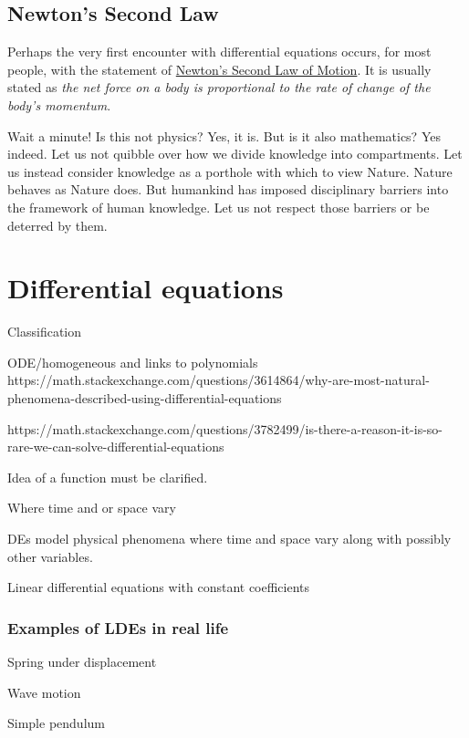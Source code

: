 \documentclass[
  a4paper,
]{article}
\begin{document}
\subsection{Newton's Second Law}\label{newtons-second-law}

Perhaps the very first encounter with differential equations occurs, for
most people, with the statement of
\href{https://www.britannica.com/science/Newtons-laws-of-motion/Newtons-second-law-F-ma}{Newton's
Second Law of Motion}. It is usually stated as \emph{the net force on a
body is proportional to the rate of change of the body's momentum}.

Wait a minute! Is this not physics? Yes, it is. But is it also
mathematics? Yes indeed. Let us not quibble over how we divide knowledge
into compartments. Let us instead consider knowledge as a porthole with
which to view Nature. Nature behaves as Nature does. But humankind has
imposed disciplinary barriers into the framework of human knowledge. Let
us not respect those barriers or be deterred by them.

\section{Differential equations}\label{differential-equations}

Classification

ODE/homogeneous and links to polynomials
https://math.stackexchange.com/questions/3614864/why-are-most-natural-phenomena-described-using-differential-equations

https://math.stackexchange.com/questions/3782499/is-there-a-reason-it-is-so-rare-we-can-solve-differential-equations

Idea of a function must be clarified.

Where time and or space vary

DEs model physical phenomena where time and space vary along with
possibly other variables.

Linear differential equations with constant coefficients

\subsubsection{Examples of LDEs in real
life}\label{examples-of-ldes-in-real-life}

Spring under displacement

Wave motion

Simple pendulum
\end{document}
